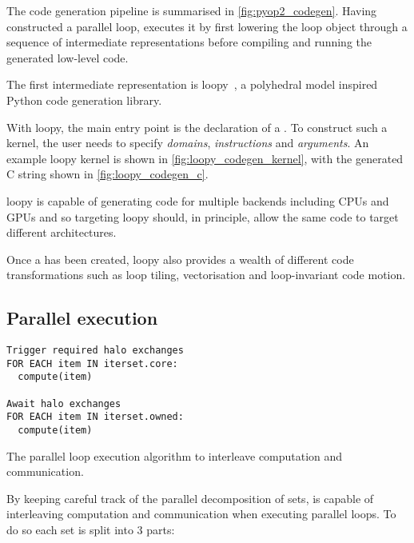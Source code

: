 \documentclass[thesis]{subfiles}
\begin{document}
The code generation pipeline is summarised in \cref{fig:pyop2_codegen}.
Having constructed a parallel loop,  executes it by first lowering the loop object through a sequence of intermediate representations before compiling and running the generated low-level code.

The first intermediate representation is loopy~\cite{klocknerLooPyTransformationbased2014}, a polyhedral model inspired Python code generation library.

With loopy, the main entry point is the declaration of a .
To construct such a kernel, the user needs to specify \textit{domains}, \textit{instructions} and \textit{arguments}.
An example loopy kernel is shown in \cref{fig:loopy_codegen_kernel}, with the generated C string shown in \cref{fig:loopy_codegen_c}.

loopy is capable of generating code for multiple backends including CPUs and GPUs and so  targeting loopy should, in principle, allow the same  code to target different architectures.

Once a  has been created, loopy also provides a wealth of different code transformations such as loop tiling, vectorisation and loop-invariant code motion.

\subsection{Parallel execution}
\label{sec:pyop2_parallel}


\begin{algorithm}
  \begin{verbatim}
Trigger required halo exchanges
FOR EACH item IN iterset.core:
  compute(item)

Await halo exchanges
FOR EACH item IN iterset.owned:
  compute(item)
  \end{verbatim}
  \caption{The  parallel loop execution algorithm to interleave computation and communication.}
  \label{alg:pyop2_comp_comm_overlap}
\end{algorithm}

By keeping careful track of the parallel decomposition of sets,  is capable of interleaving computation and communication when executing parallel loops.
To do so each set is split into 3 parts:
\end{document}
